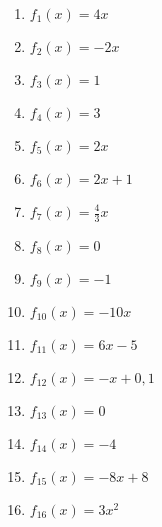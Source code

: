 \begin{Answer}[ref=ablRegelnA1]

	\begin{minipage}{\textwidth}
		\begin{minipage}{0.5\textwidth}
			\begin{enumerate}[label=\alph*)]
				\item \(f_1(x)=4x\)
				\item \(f_2(x)=-2x\)
				\item \(f_3(x)=1\)
				\item \(f_4(x)=3\)
				\item \(f_5(x)=2x\)
				\item \(f_6(x)=2x+1\)
				\item \(f_7(x)=\frac{4}{3}x\)
				\item \(f_8(x)=0\)
			\end{enumerate}
		\end{minipage}%
		\begin{minipage}{0.5\textwidth}
			\begin{enumerate}[label=\alph*)]
				\setcounter{enumi}{8}
				\item \(f_9(x)=-1\)
				\item \(f_{10}(x)=-10x\)
				\item \(f_{11}(x)=6x-5\)
				\item \(f_{12}(x)=-x+0,1\)
				\item \(f_{13}(x)=0\)
				\item \(f_{14}(x)=-4\)
				\item \(f_{15}(x)=-8x+8\)
				\item \(f_{16}(x)=3x^2\)
			\end{enumerate}
		\end{minipage}%
	\end{minipage}
\end{Answer}
